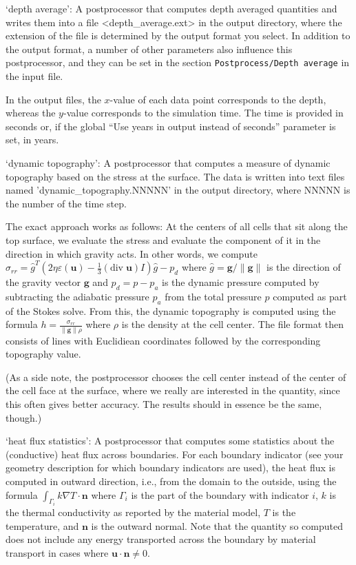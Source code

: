 \begin{itemize}
`depth average': A postprocessor that computes depth averaged quantities and writes them into a file <depth_average.ext> in the output directory, where the extension of the file is determined by the output format you select. In addition to the output format, a number of other parameters also influence this postprocessor, and they can be set in the section \texttt{Postprocess/Depth average} in the input file.

In the output files, the $x$-value of each data point corresponds to the depth, whereas the $y$-value corresponds to the simulation time. The time is provided in seconds or, if the global ``Use years in output instead of seconds'' parameter is set, in years.

`dynamic topography': A postprocessor that computes a measure of dynamic topography based on the stress at the surface. The data is written into text files named 'dynamic\_topography.NNNNN' in the output directory, where NNNNN is the number of the time step.

The exact approach works as follows: At the centers of all cells that sit along the top surface, we evaluate the stress and evaluate the component of it in the direction in which gravity acts. In other words, we compute $\sigma_{rr}={\hat g}^T(2 \eta \varepsilon(\mathbf u)- \frac 13 (\textrm{div}\;\mathbf u)I)\hat g - p_d$ where $\hat g = \mathbf g/\|\mathbf g\|$ is the direction of the gravity vector $\mathbf g$ and $p_d=p-p_a$ is the dynamic pressure computed by subtracting the adiabatic pressure $p_a$ from the total pressure $p$ computed as part of the Stokes solve. From this, the dynamic topography is computed using the formula $h=\frac{\sigma_{rr}}{\|\mathbf g\| \rho}$ where $\rho$ is the density at the cell center.
The file format then consists of lines with Euclidiean coordinates followed by the corresponding topography value.

(As a side note, the postprocessor chooses the cell center instead of the center of the cell face at the surface, where we really are interested in the quantity, since this often gives better accuracy. The results should in essence be the same, though.)

`heat flux statistics': A postprocessor that computes some statistics about the (conductive) heat flux across boundaries. For each boundary indicator (see your geometry description for which boundary indicators are used), the heat flux is computed in outward direction, i.e., from the domain to the outside, using the formula $\int_{\Gamma_i} k \nabla T \cdot \mathbf n$ where $\Gamma_i$ is the part of the boundary with indicator $i$, $k$ is the thermal conductivity as reported by the material model, $T$ is the temperature, and $\mathbf n$ is the outward normal. Note that the quantity so computed does not include any energy transported across the boundary by material transport in cases where $\mathbf u \cdot \mathbf n \neq 0$.


\end{itemize}
